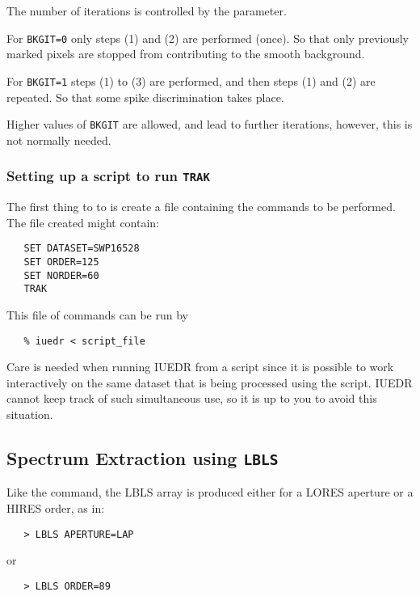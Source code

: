 The number of iterations is controlled by the 
parameter.

For \verb+BKGIT=0+ only steps (1) and (2) are performed (once)\@.  So that only
previously marked pixels are stopped from contributing to the smooth
background.

For \verb+BKGIT=1+ steps (1) to (3) are performed, and then steps (1) and (2)
are repeated.  So that some spike discrimination takes place.

Higher values of \verb+BKGIT+ are allowed, and lead to further iterations,
however, this is not normally needed.

\subsubsection{Setting up a script to run {\tt TRAK}}

The first thing to to is create a file containing the commands to be
performed.  The file created might contain:

\begin{verbatim}
   SET DATASET=SWP16528
   SET ORDER=125
   SET NORDER=60
   TRAK
\end{verbatim}

This file of commands can be run by

\begin{verbatim}
   % iuedr < script_file
\end{verbatim}

Care is needed when running IUEDR from a script since it is possible to
work interactively on the same dataset that is being processed using the
script.  IUEDR cannot keep track of such simultaneous use, so it is
up to you to avoid this situation.


\subsection{\label{subse:lbls}Spectrum Extraction using
            {\tt LBLS}}

Like the 
 command, the LBLS array is produced either for a LORES
aperture or a HIRES order, as in:

\begin{verbatim}
   > LBLS APERTURE=LAP
\end{verbatim}

or

\begin{verbatim}
   > LBLS ORDER=89
\end{verbatim}

